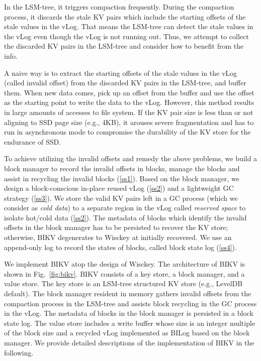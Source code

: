 \documentclass[sigconf]{acmart}
\begin{document}
In the LSM-tree, it triggers compaction frequently. During the compaction process, it discards the stale KV pairs which include the starting offsets of the stale values in the vLog. That means the LSM-tree can detect the stale values in the vLog even though the vLog is not running out. Thus, we attempt to collect the discarded KV pairs in the LSM-tree and consider how to benefit from the info.

A naive way is to extract the starting offsets of the stale values in the vLog (called invalid offset) from the discarded KV pairs in the LSM-tree, and buffer them. When new data comes, pick up an offset from the buffer and use the offset as the starting point to write the data to the vLog. However, this method results in large amounts of accesses to file system. If the KV pair size is less than or not aligning to SSD page size (e.g., 4KB), it arouses severe fragmentation and has to run in asynchronous mode to compromise the durability of the KV store for the endurance of SSD.

To achieve utilizing the invalid offsets and remedy the above problems, we build a block manager to record the invalid offsets in blocks, manage the blocks and assist in recycling the invalid blocks (\ref{ss1}). Based on the block manager, we design a block-conscious in-place reused vLog (\ref{ss2}) and a lightweight GC strategy (\ref{ss3}). We store the valid KV pairs left in a GC process (which we consider as \textit{cold data}) to a separate region in the vLog called \textit{reserved space} to isolate hot/cold data (\ref{ss2}). The metadata of blocks which identify the invalid offsets in the block manager has to be persisted to recover the KV store; otherwise, BIKV degenerates to Wisckey at initially recovered. We use an append-only log to record the states of blocks, called block state log (\ref{ss4}). 

We implement BIKV atop the design of Wisckey. The architecture of BIKV is shown in Fig.~\ref{fig:bikv}. BIKV consists of a key store, a block manager, and a value store. The key store is an LSM-tree structured KV store (e.g., LevelDB default). The block manager resident in memory gathers invalid offsets from the compaction process in the LSM-tree and assists block recycling in the GC process in the vLog. The metadata of blocks in the block manager is persisted in a block state log. The value store includes a write buffer whose size is an integer multiple of the block size and a recycled vLog implemented as BILog based on the block manager. We provide detailed descriptions of the implementation of BIKV in the following.
\end{document}
